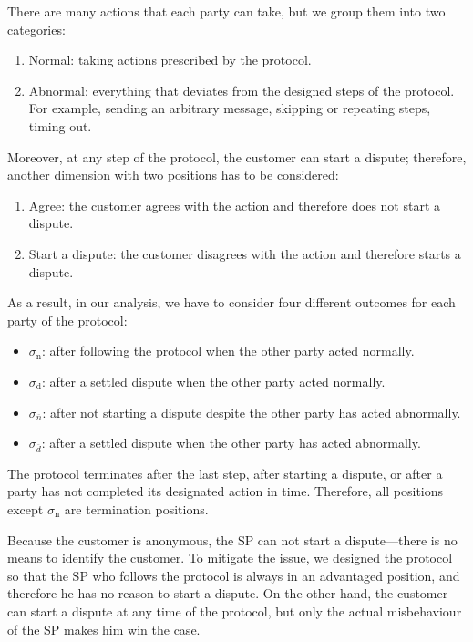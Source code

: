 \documentclass{ieeeaccess}
\begin{document}
There are many actions that each party can take, but we group them into two categories:

\begin{enumerate}
\def\labelenumi{\arabic{enumi}.}

\item Normal: taking actions prescribed by the protocol.
\item Abnormal: everything that deviates from the designed steps of the protocol. For example, sending an arbitrary message, skipping or repeating steps, timing out.
\end{enumerate}

Moreover, at any step of the protocol, the customer can start a dispute; therefore, another dimension with two positions has to be considered:

\begin{enumerate}
\def\labelenumi{\arabic{enumi}.}

\item Agree: the customer agrees with the action and therefore does not start a dispute.
\item Start a dispute: the customer disagrees with the action and therefore starts a dispute.
\end{enumerate}

As a result, in our analysis, we have to consider four different outcomes for each party of the protocol:

\begin{itemize}

\item
  $\sigma_\mathrm{n}$: after following the protocol when the other party acted normally.
\item
  $\sigma_\mathrm{d}$: after a settled dispute when the other party acted normally.
\item
  $\sigma_\overline{n}$: after not starting a dispute despite the other party has acted abnormally.
\item
  $\sigma_\overline{d}$: after a settled dispute when the other party has acted abnormally.
\end{itemize}

The protocol terminates after the last step, after starting a dispute, or after a party has not completed its designated action in time. Therefore, all positions except $\sigma_\mathrm{n}$ are termination positions.

Because the customer is anonymous, the SP can not start a dispute—there is no means to identify the customer. To mitigate the issue, we designed the protocol so that the SP who follows the protocol is always in an advantaged position, and therefore he has no reason to start a dispute. On the other hand, the customer can start a dispute at any time of the protocol, but only the actual misbehaviour of the SP makes him win the case.
\end{document}
